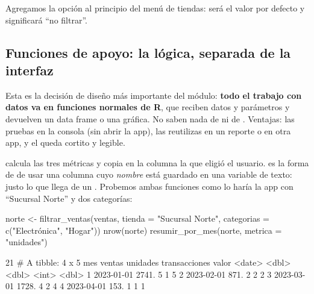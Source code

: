 Agregamos la opción  al principio del menú de tiendas: será
el valor por defecto y significará ``no filtrar''.

\subsection{Funciones de apoyo: la lógica, separada de la interfaz}

Esta es la decisión de diseño más importante del módulo: \textbf{todo el
trabajo con datos va en funciones normales de R}, que reciben datos y
parámetros y devuelven un data frame o una gráfica. No saben nada de
 ni de . Ventajas: las pruebas en la consola
(sin abrir la app), las reutilizas en un reporte o en otra app, y el
 queda cortito y legible.


 calcula las tres métricas y copia en la columna
 la que eligió el usuario.  es la
forma de  de usar una columna cuyo \emph{nombre} está
guardado en una variable de texto: justo lo que llega de un
. Probemos ambas funciones como lo haría la app con
``Sucursal Norte'' y dos categorías:

\begin{rcode}
norte <- filtrar_ventas(ventas, tienda = "Sucursal Norte",
                        categorias = c("Electrónica", "Hogar"))
nrow(norte)
resumir_por_mes(norte, metrica = "unidades") %
\end{rcode}
\begin{rsalida}
[1] 21
# A tibble: 4 x 5
  mes        ventas unidades transacciones valor
  <date>      <dbl>    <dbl>         <int> <dbl>
1 2023-01-01  2741.        5             1     5
2 2023-02-01   871.        2             2     2
3 2023-03-01  1728.        4             2     4
4 2023-04-01   153.        1             1     1
\end{rsalida}

